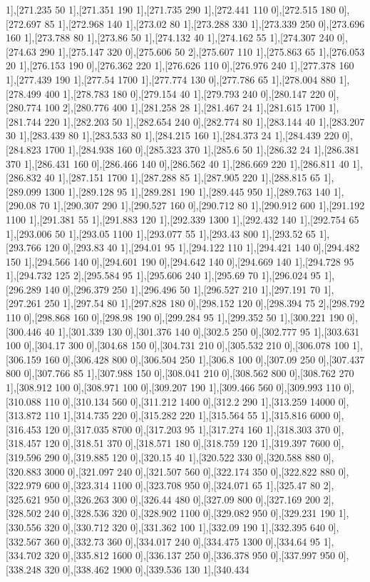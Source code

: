 {1],[271.235 50 1],[271.351 190 1],[271.735 290 1],[272.441 110 0],[272.515 180 0],[272.697 85 1],[272.968 140 1],[273.02 80 1],[273.288 330 1],[273.339 250 0],[273.696 160 1],[273.788 80 1],[273.86 50 1],[274.132 40 1],[274.162 55 1],[274.307 240 0],[274.63 290 1],[275.147 320 0],[275.606 50 2],[275.607 110 1],[275.863 65 1],[276.053 20 1],[276.153 190 0],[276.362 220 1],[276.626 110 0],[276.976 240 1],[277.378 160 1],[277.439 190 1],[277.54 1700 1],[277.774 130 0],[277.786 65 1],[278.004 880 1],[278.499 400 1],[278.783 180 0],[279.154 40 1],[279.793 240 0],[280.147 220 0],[280.774 100 2],[280.776 400 1],[281.258 28 1],[281.467 24 1],[281.615 1700 1],[281.744 220 1],[282.203 50 1],[282.654 240 0],[282.774 80 1],[283.144 40 1],[283.207 30 1],[283.439 80 1],[283.533 80 1],[284.215 160 1],[284.373 24 1],[284.439 220 0],[284.823 1700 1],[284.938 160 0],[285.323 370 1],[285.6 50 1],[286.32 24 1],[286.381 370 1],[286.431 160 0],[286.466 140 0],[286.562 40 1],[286.669 220 1],[286.811 40 1],[286.832 40 1],[287.151 1700 1],[287.288 85 1],[287.905 220 1],[288.815 65 1],[289.099 1300 1],[289.128 95 1],[289.281 190 1],[289.445 950 1],[289.763 140 1],[290.08 70 1],[290.307 290 1],[290.527 160 0],[290.712 80 1],[290.912 600 1],[291.192 1100 1],[291.381 55 1],[291.883 120 1],[292.339 1300 1],[292.432 140 1],[292.754 65 1],[293.006 50 1],[293.05 1100 1],[293.077 55 1],[293.43 800 1],[293.52 65 1],[293.766 120 0],[293.83 40 1],[294.01 95 1],[294.122 110 1],[294.421 140 0],[294.482 150 1],[294.566 140 0],[294.601 190 0],[294.642 140 0],[294.669 140 1],[294.728 95 1],[294.732 125 2],[295.584 95 1],[295.606 240 1],[295.69 70 1],[296.024 95 1],[296.289 140 0],[296.379 250 1],[296.496 50 1],[296.527 210 1],[297.191 70 1],[297.261 250 1],[297.54 80 1],[297.828 180 0],[298.152 120 0],[298.394 75 2],[298.792 110 0],[298.868 160 0],[298.98 190 0],[299.284 95 1],[299.352 50 1],[300.221 190 0],[300.446 40 1],[301.339 130 0],[301.376 140 0],[302.5 250 0],[302.777 95 1],[303.631 100 0],[304.17 300 0],[304.68 150 0],[304.731 210 0],[305.532 210 0],[306.078 100 1],[306.159 160 0],[306.428 800 0],[306.504 250 1],[306.8 100 0],[307.09 250 0],[307.437 800 0],[307.766 85 1],[307.988 150 0],[308.041 210 0],[308.562 800 0],[308.762 270 1],[308.912 100 0],[308.971 100 0],[309.207 190 1],[309.466 560 0],[309.993 110 0],[310.088 110 0],[310.134 560 0],[311.212 1400 0],[312.2 290 1],[313.259 14000 0],[313.872 110 1],[314.735 220 0],[315.282 220 1],[315.564 55 1],[315.816 6000 0],[316.453 120 0],[317.035 8700 0],[317.203 95 1],[317.274 160 1],[318.303 370 0],[318.457 120 0],[318.51 370 0],[318.571 180 0],[318.759 120 1],[319.397 7600 0],[319.596 290 0],[319.885 120 0],[320.15 40 1],[320.522 330 0],[320.588 880 0],[320.883 3000 0],[321.097 240 0],[321.507 560 0],[322.174 350 0],[322.822 880 0],[322.979 600 0],[323.314 1100 0],[323.708 950 0],[324.071 65 1],[325.47 80 2],[325.621 950 0],[326.263 300 0],[326.44 480 0],[327.09 800 0],[327.169 200 2],[328.502 240 0],[328.536 320 0],[328.902 1100 0],[329.082 950 0],[329.231 190 1],[330.556 320 0],[330.712 320 0],[331.362 100 1],[332.09 190 1],[332.395 640 0],[332.567 360 0],[332.73 360 0],[334.017 240 0],[334.475 1300 0],[334.64 95 1],[334.702 320 0],[335.812 1600 0],[336.137 250 0],[336.378 950 0],[337.997 950 0],[338.248 320 0],[338.462 1900 0],[339.536 130 1],[340.434 }
